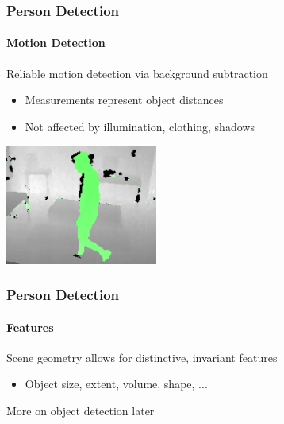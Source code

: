 \documentclass[xetex,professionalfont]{beamer}
\begin{document}
\begin{frame}
\frametitle{Person Detection}
\framesubtitle{Motion Detection}

Reliable motion detection via background subtraction
\begin{itemize}
    \item Measurements represent object distances
    \item Not affected by illumination, clothing, shadows %
\end{itemize}

\begin{center}
\includegraphics[width=5cm]{figures/fearless-depth.png}
\end{center}

\end{frame}


\begin{frame}
\frametitle{Person Detection}
\framesubtitle{Features}

Scene geometry allows for distinctive, invariant features
\begin{itemize}
    \item Object size, extent, volume, shape, ... %
\end{itemize}

\bigskip
More on object detection later

\end{frame}

\end{document}
